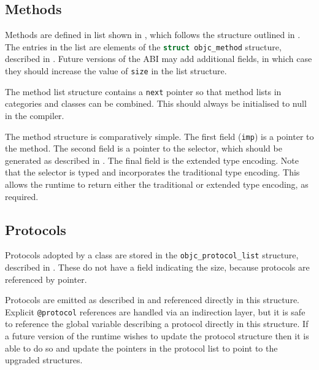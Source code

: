 \documentclass[a4paper]{report}
\newcommand{\ccode}[1]{\lstinline[language={C}]{#1}}
\newcommand{\objc}[1]{\lstinline[language={[Objective]C}]{#1}}
\newcommand{\inccode}[4]{
{
	 }}
	]{../#1}
}
}
\begin{document}
\subsection{Methods}


Methods are defined in list shown in , which follows the structure outlined in .
The entries in the list are elements of the \ccode{struct objc_method} structure, described in .
Future versions of the ABI may add additional fields, in which case they should increase the value of \ccode{size} in the list structure.

The method list structure contains a \ccode{next} pointer so that method lists in categories and classes can be combined.
This should always be initialised to null in the compiler.

\inccode{method.h}{methodlist}{objc_method_list}{The method structure.}
\inccode{method.h}{method}{objc_method}{The method structure.}

The method structure is comparatively simple.
The first field (\ccode{imp}) is a pointer to the method.
The second field is a pointer to the selector, which should be generated as described in .
The final field is the extended type encoding.
Note that the selector is typed and incorporates the traditional type encoding.
This allows the runtime to return either the traditional or extended type encoding, as required.

\subsection{Protocols}

Protocols adopted by a class are stored in the \ccode{objc_protocol_list} structure, described in .
These do not have a field indicating the size, because protocols are referenced by pointer.

\inccode{protocol.h}{protocollist}{objc_protocol_list}{The protocol structure.}

Protocols are emitted as described in  and referenced directly in this structure.
Explicit \objc{@protocol} references are handled via an indirection layer, but it is safe to reference the global variable describing a protocol directly in this structure.
If a future version of the runtime wishes to update the protocol structure then it is able to do so and update the pointers in the protocol list to point to the upgraded structures.
\end{document}
